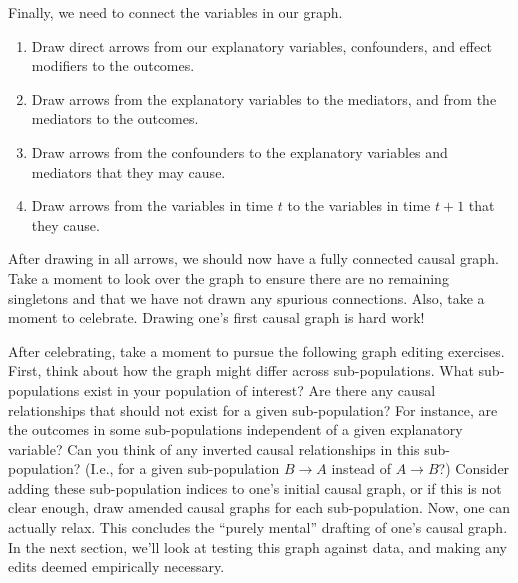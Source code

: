 Finally, we need to connect the variables in our graph.
\begin{enumerate}
   \item Draw direct arrows from our explanatory variables, confounders, and effect modifiers to the outcomes.
   \item Draw arrows from the explanatory variables to the mediators, and from the mediators to the outcomes.
   \item Draw arrows from the confounders to the explanatory variables and mediators that they may cause.
   \item Draw arrows from the variables in time $t$ to the variables in time $t+1$ that they cause.
\end{enumerate}
After drawing in all arrows, we should now have a fully connected causal graph.
Take a moment to look over the graph to ensure there are no remaining singletons and that we have not drawn any spurious connections.
Also, take a moment to celebrate.
Drawing one's first causal graph is hard work!

After celebrating, take a moment to pursue the following graph editing exercises.
First, think about how the graph might differ across sub-populations.
What sub-populations exist in your population of interest?
Are there any causal relationships that should not exist for a given sub-population?
For instance, are the outcomes in some sub-populations independent of a given explanatory variable?
Can you think of any inverted causal relationships in this sub-population?
(I.e., for a given sub-population $B \rightarrow A$ instead of $A \rightarrow B$?)
Consider adding these sub-population indices to one's initial causal graph, or if this is not clear enough, draw amended causal graphs for each sub-population.
Now, one can actually relax.
This concludes the ``purely mental'' drafting of one's causal graph.
In the next section, we'll look at testing this graph against data, and making any edits deemed empirically necessary.
